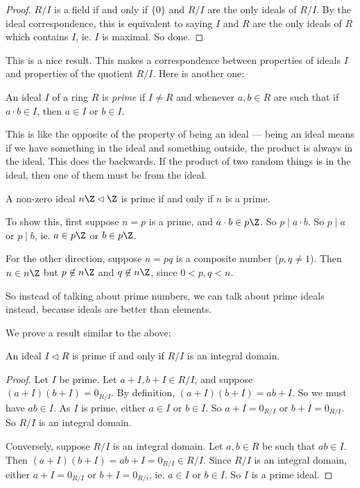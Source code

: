 \documentclass[a4paper]{article}
\begin{document}
\begin{proof}
  $R/I$ is a field if and only if $\{0\}$ and $R/I$ are the only ideals of $R/I$. By the ideal correspondence, this is equivalent to saying $I$ and $R$ are the only ideals of $R$ which contains $I$, ie. $I$ is maximal. So done.
\end{proof}
This is a nice result. This makes a correspondence between properties of ideals $I$ and properties of the quotient $R/I$. Here is another one:

\begin{defi}
  An ideal $I$ of a ring $R$ is \emph{prime} if $I \not= R$ and whenever $a, b \in R$ are such that if $a\cdot b \in I$, then $a \in I$ or $b \in I$.
\end{defi}

This is like the opposite of the property of being an ideal --- being an ideal means if we have something in the ideal and something outside, the product is always in the ideal. This does the backwards. If the product of two random things is in the ideal, then one of them must be from the ideal.

\begin{eg}
  A non-zero ideal $n\Z \lhd \Z$ is prime if and only if $n$ is a prime.

  To show this, first suppose $n = p$ is a prime, and $a\cdot b \in p\Z$. So $p \mid a\cdot b$. So $p \mid a$ or $p \mid b$, ie. $a \in p\Z$ or $b \in p\Z$.

  For the other direction, suppose $n = pq$ is a composite number ($p, q \not= 1$). Then $n \in n\Z$ but $p \not\in n\Z$ and $q \not\in n\Z$, since $0 < p, q < n$.
\end{eg}
So instead of talking about prime numbers, we can talk about prime ideals instead, because ideals are better than elements.

We prove a result similar to the above:
\begin{lemma}
  An ideal $I \lhd R$ is prime if and only if $R/I$ is an integral domain.
\end{lemma}

\begin{proof}
  Let $I$ be prime. Let $a + I, b + I \in R/I$, and suppose $(a + I)(b + I) = 0_{R/I}$. By definition, $(a + I)(b + I) = ab + I$. So we must have $ab \in I$. As $I$ is prime, either $a \in I$ or $b \in I$. So $a + I = 0_{R/I}$ or $b + I = 0_{R/I}$. So $R/I$ is an integral domain.

  Conversely, suppose $R/I$ is an integral domain. Let $a, b \in R$ be such that $ab \in I$. Then $(a + I)(b + I) = ab + I = 0_{R/I} \in R/I$. Since $R/I$ is an integral domain, either $a + I = 0_{R/I}$ or $b + I = 0_{R/i}$, ie. $a \in I$ or $b\in I$. So $I$ is a prime ideal.
\end{proof}
\end{document}
